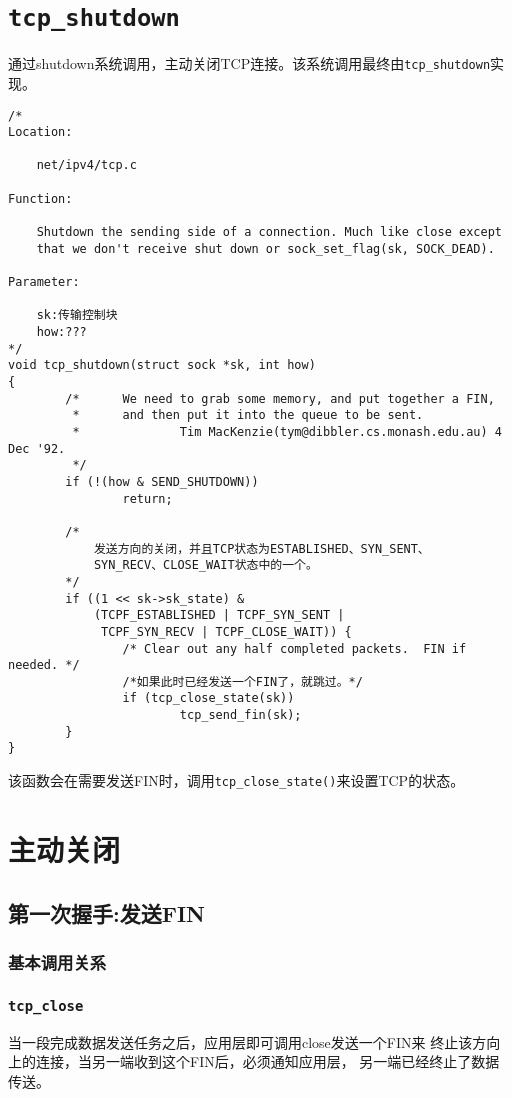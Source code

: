 \section{\texttt{tcp_shutdown}}
			\label{ClientSendFin:tcp_shutdown}
			通过shutdown系统调用，主动关闭TCP连接。该系统调用最终由\texttt{tcp_shutdown}实现。
\begin{verbatim}
/*
Location:

	net/ipv4/tcp.c

Function:

	Shutdown the sending side of a connection. Much like close except
	that we don't receive shut down or sock_set_flag(sk, SOCK_DEAD).

Parameter:

	sk:传输控制块
	how:???
*/
void tcp_shutdown(struct sock *sk, int how)
{
        /*      We need to grab some memory, and put together a FIN,
         *      and then put it into the queue to be sent.
         *              Tim MacKenzie(tym@dibbler.cs.monash.edu.au) 4 Dec '92.
         */
        if (!(how & SEND_SHUTDOWN))
                return;

        /*
			发送方向的关闭，并且TCP状态为ESTABLISHED、SYN_SENT、
			SYN_RECV、CLOSE_WAIT状态中的一个。
		*/
        if ((1 << sk->sk_state) &
            (TCPF_ESTABLISHED | TCPF_SYN_SENT |
             TCPF_SYN_RECV | TCPF_CLOSE_WAIT)) {
                /* Clear out any half completed packets.  FIN if needed. */
				/*如果此时已经发送一个FIN了，就跳过。*/                
				if (tcp_close_state(sk))
                        tcp_send_fin(sk);
        }
}
\end{verbatim}
	
	该函数会在需要发送FIN时，调用\texttt{tcp_close_state()}来设置TCP的状态。

\section{主动关闭}
\label{Actively Close}

	\subsection{第一次握手:发送FIN}
		\subsubsection{基本调用关系}
		
		\subsubsection{\texttt{tcp_close}}
			当一段完成数据发送任务之后，应用层即可调用close发送一个FIN来
			终止该方向上的连接，当另一端收到这个FIN后，必须通知应用层，
			另一端已经终止了数据传送。

